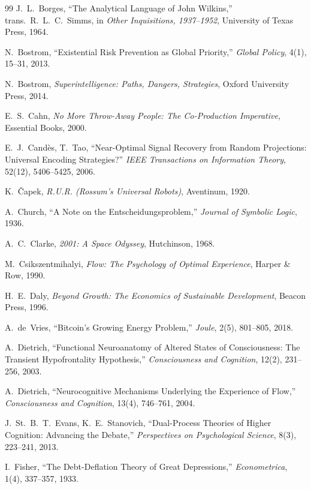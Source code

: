 \begin{thebibliography}{99}
J.~L.~Borges, ``The Analytical Language of John Wilkins,'' trans.\ R.~L.~C.~Simms, in \textit{Other Inquisitions, 1937--1952}, University of Texas Press, 1964.

N.~Bostrom, ``Existential Risk Prevention as Global Priority,'' \textit{Global Policy}, 4(1), 15--31, 2013.

N.~Bostrom, \textit{Superintelligence: Paths, Dangers, Strategies}, Oxford University Press, 2014.

E.~S.~Cahn, \textit{No More Throw-Away People: The Co-Production Imperative}, Essential Books, 2000.

E.~J.~Candès, T.~Tao, ``Near-Optimal Signal Recovery from Random Projections: Universal Encoding Strategies?'' \textit{IEEE Transactions on Information Theory}, 52(12), 5406--5425, 2006.

K.~Čapek, \textit{R.U.R. (Rossum's Universal Robots)}, Aventinum, 1920.

A.~Church, ``A Note on the Entscheidungsproblem,'' \textit{Journal of Symbolic Logic}, 1936.

A.~C.~Clarke, \textit{2001: A Space Odyssey}, Hutchinson, 1968.

M.~Csikszentmihalyi, \textit{Flow: The Psychology of Optimal Experience}, Harper \& Row, 1990.

H.~E.~Daly, \textit{Beyond Growth: The Economics of Sustainable Development}, Beacon Press, 1996.

A.~de~Vries, ``Bitcoin's Growing Energy Problem,'' \textit{Joule}, 2(5), 801--805, 2018.

A.~Dietrich, ``Functional Neuroanatomy of Altered States of Consciousness: The Transient Hypofrontality Hypothesis,'' \textit{Consciousness and Cognition}, 12(2), 231--256, 2003.

A.~Dietrich, ``Neurocognitive Mechanisms Underlying the Experience of Flow,'' \textit{Consciousness and Cognition}, 13(4), 746--761, 2004.

J.~St.~B.~T.~Evans, K.~E.~Stanovich, ``Dual-Process Theories of Higher Cognition: Advancing the Debate,'' \textit{Perspectives on Psychological Science}, 8(3), 223--241, 2013.

I.~Fisher, ``The Debt-Deflation Theory of Great Depressions,'' \textit{Econometrica}, 1(4), 337--357, 1933.


\end{thebibliography}
